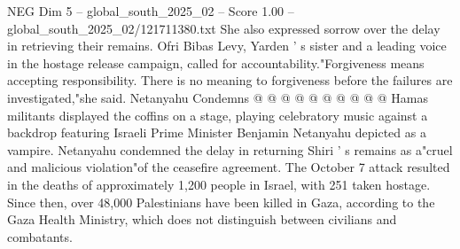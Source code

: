 \begin{textsample}{NEG Dim 5 – global\_south\_2025\_02 – Score 1.00 – global\_south\_2025\_02/121711380.txt}
She also expressed sorrow over the delay in retrieving their remains.
Ofri Bibas Levy, Yarden ' s sister and a leading voice in the hostage release campaign, called for accountability."Forgiveness means accepting responsibility.
There is no meaning to forgiveness before the failures are investigated,"she said.
Netanyahu Condemns @ @ @ @ @ @ @ @ @ @ Hamas militants displayed the coffins on a stage, playing celebratory music against a backdrop featuring Israeli Prime Minister Benjamin Netanyahu depicted as a vampire.
Netanyahu condemned the delay in returning Shiri ' s remains as a"cruel and malicious violation"of the ceasefire agreement.
The October 7 attack resulted in the deaths of approximately 1,200 people in Israel, with 251 taken hostage.
Since then, over 48,000 Palestinians have been killed in Gaza, according to the Gaza Health Ministry, which does not distinguish between civilians and combatants.

\end{textsample}
